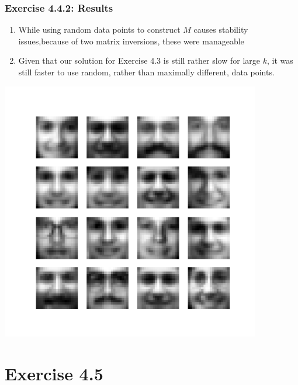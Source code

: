 \documentclass[10pt,aspectratio=169,handout]{beamer}
\begin{document}
\begin{frame}
    \frametitle{Exercise 4.4.2: Results}
    \begin{minipage}{0.49\textwidth}
        \begin{enumerate}
            \item While using random data points to construct $M$ causes stability issues,because of two matrix inversions, these were manageable
            \item Given that our solution for Exercise 4.3 is still rather slow for large $k$, it was still faster 
            to use random, rather than maximally different, data points.
        \end{enumerate}
    \end{minipage}    
    \begin{minipage}{0.49\textwidth}
        \includegraphics[width=0.85\textwidth]{images/faces_mean4_4.png}
    \end{minipage}

\end{frame}

\section{Exercise 4.5}
\end{document}
